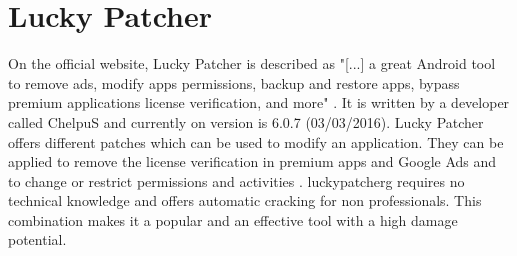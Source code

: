 \section{Lucky Patcher} \label{section:luckypatcher-explain}
On the official website, Lucky Patcher is described as "[...] a great Android tool to remove ads, modify apps permissions, backup and restore apps, bypass premium applications license verification, and more" \cite{luckyPatcherOfficial}.
It is written by a developer called ChelpuS and currently on version is 6.0.7 (03/03/2016).
\newline
Lucky Patcher offers different patches which can be used to modify an application.
They can be applied to remove the license verification in premium apps and Google Ads and to change or restrict permissions and activities \cite{luckyPatcherOfficial}.
\newline
\gls{luckypatcherg} requires no technical knowledge and offers automatic cracking for non professionals.
This combination makes it a popular and an effective tool with a high damage potential. \cite{munteanLicense}
\newline
